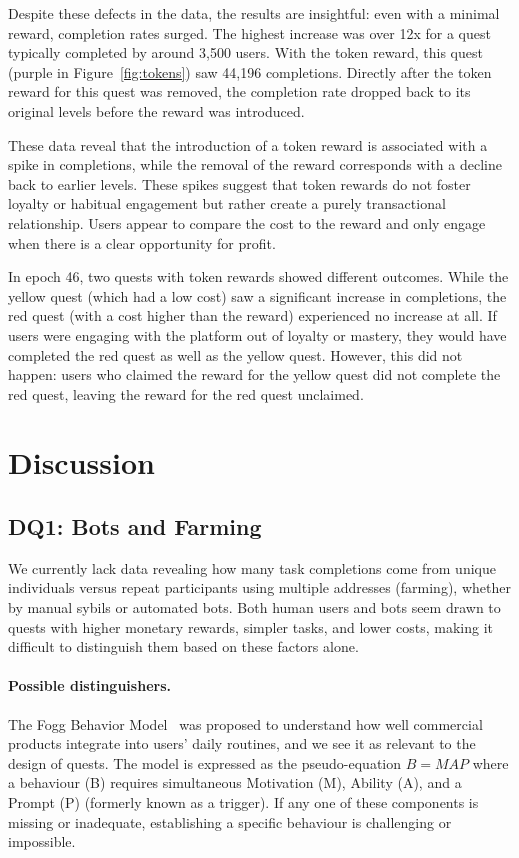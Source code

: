 Despite these defects in the data, the results are insightful: even with a minimal reward, completion rates surged. The highest increase was over 12x for a quest typically completed by around 3,500 users. With the token reward, this quest (purple in Figure~\ref{fig:tokens}) saw 44,196 completions. Directly after the token reward for this quest was removed, the completion rate dropped back to its original levels before the reward was introduced. 

These data reveal that the introduction of a token reward is associated with a spike in completions, while the removal of the reward corresponds with a decline back to earlier levels. These spikes suggest that token rewards do not foster loyalty or habitual engagement but rather create a purely transactional relationship. Users appear to compare the cost to the reward and only engage when there is a clear opportunity for profit.

In epoch 46, two quests with token rewards showed different outcomes. While the yellow quest (which had a low cost) saw a significant increase in completions, the red quest (with a cost higher than the reward) experienced no increase at all. If users were engaging with the platform out of loyalty or mastery, they would have completed the red quest as well as the yellow quest. However, this did not happen: users who claimed the reward for the yellow quest did not complete the red quest, leaving the reward for the red quest unclaimed.


\section{Discussion}

\subsection{DQ1: Bots and Farming}

We currently lack data revealing how many task completions come from unique individuals versus repeat participants using multiple addresses (farming), whether by manual sybils or automated bots. Both human users and bots seem drawn to quests with higher monetary rewards, simpler tasks, and lower costs, making it difficult to distinguish them based on these factors alone.

\paragraph{Possible distinguishers.} The Fogg Behavior Model~\cite{Fogg09} was proposed to understand how well commercial products integrate into users’ daily routines, and we see it as relevant to the design of quests. The model is expressed as the pseudo-equation $B=MAP$ where a behaviour (B) requires simultaneous Motivation (M), Ability (A), and a Prompt (P) (formerly known as a trigger). If any one of these components is missing or inadequate, establishing a specific behaviour is challenging or impossible.

